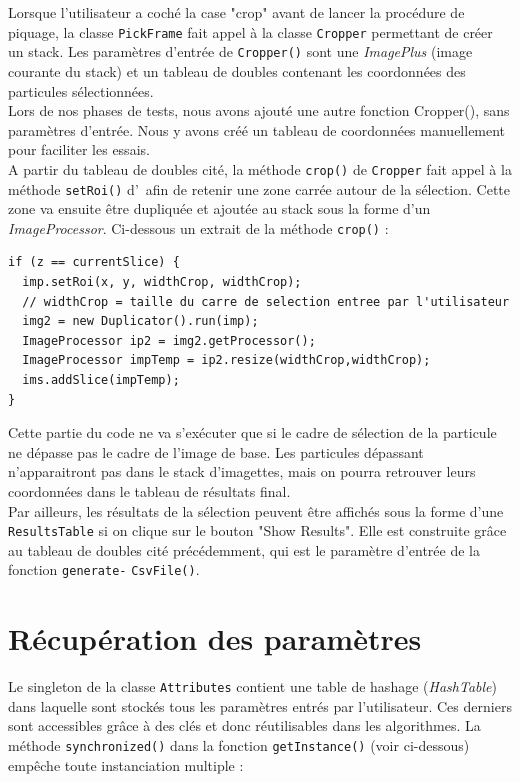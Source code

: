 Lorsque l'utilisateur a coché la case "crop" avant de lancer la procédure de piquage, la classe \texttt{PickFrame} fait appel à la classe \texttt{Cropper} permettant de créer un stack. Les paramètres d'entrée de \texttt{Cropper()} sont une \emph{ImagePlus} (image courante du stack) et un tableau de doubles contenant les coordonnées des particules sélectionnées. \\
Lors de nos phases de tests, nous avons ajouté une autre fonction Cropper(), sans paramètres d'entrée. Nous y avons créé un tableau de coordonnées manuellement pour faciliter les essais. \\
A partir du tableau de doubles cité, la méthode \texttt{crop()} de \texttt{Cropper} fait appel à la méthode \texttt{setRoi()} d'\imj ~afin de retenir une zone carrée autour de la sélection. Cette zone va ensuite être dupliquée et ajoutée au stack sous la forme d'un \emph{ImageProcessor}. Ci-dessous un extrait de la méthode \texttt{crop()} :

\begin{small}
\begin{lstlisting}
if (z == currentSlice) {
  imp.setRoi(x, y, widthCrop, widthCrop);  
  // widthCrop = taille du carre de selection entree par l'utilisateur
  img2 = new Duplicator().run(imp);
  ImageProcessor ip2 = img2.getProcessor();
  ImageProcessor impTemp = ip2.resize(widthCrop,widthCrop);
  ims.addSlice(impTemp);
}
\end{lstlisting}
\end{small}	

Cette partie du code ne va s'exécuter que si le cadre de sélection de la particule ne dépasse pas le cadre de l'image de base. Les particules dépassant n'apparaitront pas dans le stack d'imagettes, mais on pourra retrouver leurs coordonnées dans le tableau de résultats final. \\

Par ailleurs, les résultats de la sélection peuvent être affichés sous la forme d'une \texttt{ResultsTable} si on clique sur le bouton "Show Results". Elle est construite grâce au tableau de doubles cité précédemment, qui est le paramètre d'entrée de la fonction \texttt{generate-} \texttt{CsvFile()}. 

\section{Récupération des paramètres}

Le singleton de la classe \texttt{Attributes} contient une table de hashage (\emph{HashTable}) dans laquelle sont stockés tous les paramètres entrés par l'utilisateur. Ces derniers sont accessibles grâce à des clés et donc réutilisables dans les algorithmes. La méthode  \texttt{synchronized()} dans la fonction \texttt{getInstance()} (voir ci-dessous) empêche toute instanciation multiple :

